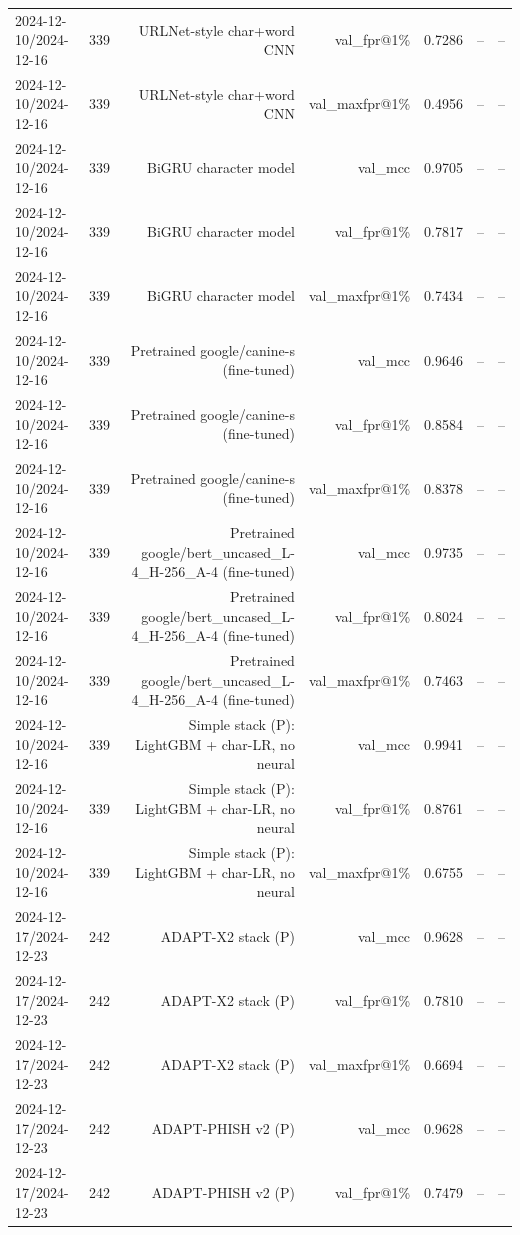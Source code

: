 \begin{table}[t]
\begin{tabular}{llrrrrr}
2024-12-10/2024-12-16 & 339 & URLNet-style char+word CNN & val\_fpr@1\% & 0.7286 & -- & -- \\
2024-12-10/2024-12-16 & 339 & URLNet-style char+word CNN & val\_maxfpr@1\% & 0.4956 & -- & -- \\
2024-12-10/2024-12-16 & 339 & BiGRU character model & val\_mcc & 0.9705 & -- & -- \\
2024-12-10/2024-12-16 & 339 & BiGRU character model & val\_fpr@1\% & 0.7817 & -- & -- \\
2024-12-10/2024-12-16 & 339 & BiGRU character model & val\_maxfpr@1\% & 0.7434 & -- & -- \\
2024-12-10/2024-12-16 & 339 & Pretrained google/canine-s (fine-tuned) & val\_mcc & 0.9646 & -- & -- \\
2024-12-10/2024-12-16 & 339 & Pretrained google/canine-s (fine-tuned) & val\_fpr@1\% & 0.8584 & -- & -- \\
2024-12-10/2024-12-16 & 339 & Pretrained google/canine-s (fine-tuned) & val\_maxfpr@1\% & 0.8378 & -- & -- \\
2024-12-10/2024-12-16 & 339 & Pretrained google/bert\_uncased\_L-4\_H-256\_A-4 (fine-tuned) & val\_mcc & 0.9735 & -- & -- \\
2024-12-10/2024-12-16 & 339 & Pretrained google/bert\_uncased\_L-4\_H-256\_A-4 (fine-tuned) & val\_fpr@1\% & 0.8024 & -- & -- \\
2024-12-10/2024-12-16 & 339 & Pretrained google/bert\_uncased\_L-4\_H-256\_A-4 (fine-tuned) & val\_maxfpr@1\% & 0.7463 & -- & -- \\
2024-12-10/2024-12-16 & 339 & Simple stack (P): LightGBM + char-LR, no neural & val\_mcc & 0.9941 & -- & -- \\
2024-12-10/2024-12-16 & 339 & Simple stack (P): LightGBM + char-LR, no neural & val\_fpr@1\% & 0.8761 & -- & -- \\
2024-12-10/2024-12-16 & 339 & Simple stack (P): LightGBM + char-LR, no neural & val\_maxfpr@1\% & 0.6755 & -- & -- \\
2024-12-17/2024-12-23 & 242 & ADAPT-X2 stack (P) & val\_mcc & 0.9628 & -- & -- \\
2024-12-17/2024-12-23 & 242 & ADAPT-X2 stack (P) & val\_fpr@1\% & 0.7810 & -- & -- \\
2024-12-17/2024-12-23 & 242 & ADAPT-X2 stack (P) & val\_maxfpr@1\% & 0.6694 & -- & -- \\
2024-12-17/2024-12-23 & 242 & ADAPT-PHISH v2 (P) & val\_mcc & 0.9628 & -- & -- \\
2024-12-17/2024-12-23 & 242 & ADAPT-PHISH v2 (P) & val\_fpr@1\% & 0.7479 & -- & -- \\

\end{tabular}
\end{table}
